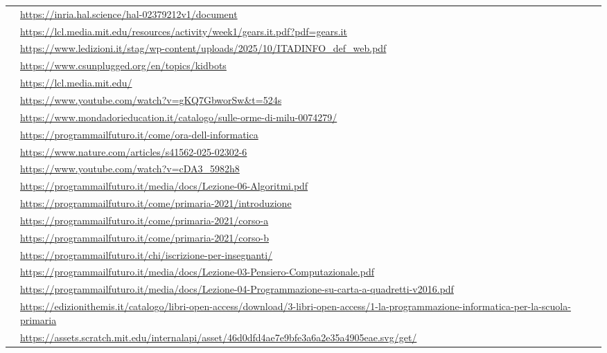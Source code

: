 \begin{longtable}{@{}>{\raggedright\arraybackslash}p{}>{\raggedright\arraybackslash}p{}@{}}
 & \url{https://inria.hal.science/hal-02379212v1/document} \\[4pt]
 & \url{https://lcl.media.mit.edu/resources/activity/week1/gears.it.pdf?pdf=gears.it} \\[4pt]
 & \url{https://www.ledizioni.it/stag/wp-content/uploads/2025/10/ITADINFO_def_web.pdf} \\[4pt]
 & \url{https://www.csunplugged.org/en/topics/kidbots} \\[4pt]
 & \url{https://lcl.media.mit.edu/} \\[4pt]
 & \url{https://www.youtube.com/watch?v=gKQ7GbworSw&t=524s} \\[4pt]
 & \url{https://www.mondadorieducation.it/catalogo/sulle-orme-di-milu-0074279/} \\[4pt]
 & \url{https://programmailfuturo.it/come/ora-dell-informatica} \\[4pt]
 & \url{https://www.nature.com/articles/s41562-025-02302-6} \\[4pt]
 & \url{https://www.youtube.com/watch?v=cDA3_5982h8} \\[4pt]
 & \url{https://programmailfuturo.it/media/docs/Lezione-06-Algoritmi.pdf} \\[4pt]
 & \url{https://programmailfuturo.it/come/primaria-2021/introduzione} \\[4pt]
 & \url{https://programmailfuturo.it/come/primaria-2021/corso-a} \\[4pt]
 & \url{https://programmailfuturo.it/come/primaria-2021/corso-b} \\[4pt]
 & \url{https://programmailfuturo.it/chi/iscrizione-per-insegnanti/} \\[4pt]
 & \url{https://programmailfuturo.it/media/docs/Lezione-03-Pensiero-Computazionale.pdf} \\[4pt]
 & \url{https://programmailfuturo.it/media/docs/Lezione-04-Programmazione-su-carta-a-quadretti-v2016.pdf} \\[4pt]
 & \url{https://edizionithemis.it/catalogo/libri-open-access/download/3-libri-open-access/1-la-programmazione-informatica-per-la-scuola-primaria} \\[4pt]
 & \url{https://assets.scratch.mit.edu/internalapi/asset/46d0dfd4ae7e9bfe3a6a2e35a4905eae.svg/get/} \\[4pt]

\end{longtable}
